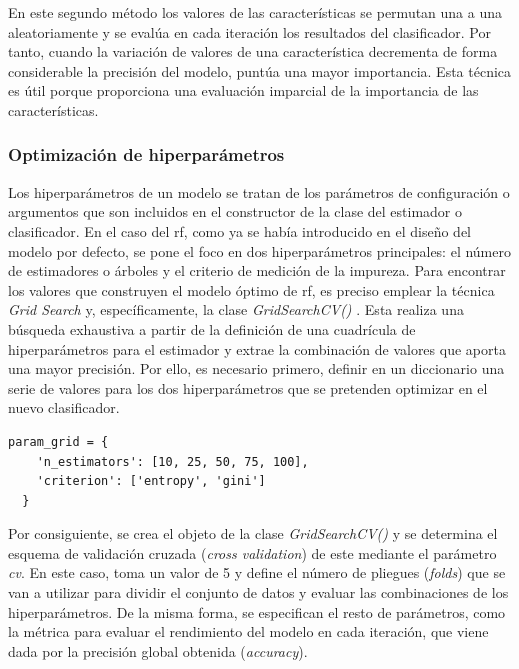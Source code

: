 En este segundo método los valores de las características se permutan una a una aleatoriamente y se evalúa en cada iteración los resultados del clasificador. Por tanto, cuando la variación de valores de una característica decrementa de forma considerable la precisión del modelo, puntúa una mayor importancia. Esta técnica es útil porque proporciona una evaluación imparcial de la importancia de las características. 

\subsubsection{Optimización de hiperparámetros}
\label{rf2}

Los hiperparámetros de un modelo se tratan de los parámetros de configuración o argumentos que son incluidos en el constructor de la clase del estimador o clasificador. En el caso del \gls{rf}, como ya se había introducido en el diseño del modelo por defecto, se pone el foco en dos hiperparámetros principales: el número de estimadores o árboles y el criterio de medición de la impureza. Para encontrar los valores que construyen el modelo óptimo de \gls{rf}, es preciso emplear la técnica \textit{Grid Search} \cite{gridsearch} y, específicamente, la clase \textit{GridSearchCV()} \cite{gridsearch2}. Esta realiza una búsqueda exhaustiva a partir de la definición de una cuadrícula de hiperparámetros para el estimador y extrae la combinación de valores que aporta una mayor precisión. Por ello, es necesario primero, definir en un diccionario una serie de valores para los dos hiperparámetros que se pretenden optimizar en el nuevo clasificador.

\vspace{3mm}

\begin{lstlisting}[style=Python, caption={Cuadrícula de parámetros}]
  param_grid = {
    'n_estimators': [10, 25, 50, 75, 100],
    'criterion': ['entropy', 'gini']
  }
\end{lstlisting}

\vspace{3mm}

Por consiguiente, se crea el objeto de la clase \textit{GridSearchCV()} y se determina el esquema de validación cruzada (\textit{cross validation}) de este mediante el parámetro \textit{cv}. En este caso, toma un valor de 5 y define el número de pliegues (\textit{folds}) que se van a utilizar para dividir el conjunto de datos y evaluar las combinaciones de los hiperparámetros. De la misma forma, se especifican el resto de parámetros, como la métrica para evaluar el rendimiento del modelo en cada iteración, que viene dada por la precisión global obtenida (\textit{accuracy}). 

